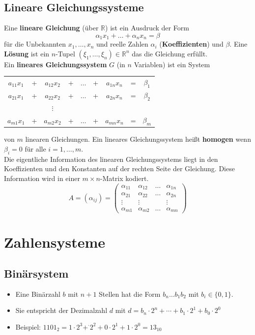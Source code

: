 \documentclass[12pt]{article}
\begin{document}
\subsection{Lineare Gleichungssysteme}
Eine \textbf{lineare Gleichung} (über $\mathbb{R}$) ist ein Ausdruck der Form
\[\alpha_1x_1 + \dots + \alpha_nx_n = \beta\]
für die Unbekannten $x_1, \dots, x_n$ und reelle Zahlen $\alpha_i$ (\textbf{Koeffizienten}) und $\beta$. Eine \textbf{Lösung} ist ein $n$-Tupel $(\xi_1, \dots, \xi_n) \in \mathbb{R}^n$ das die Gleichung erfüllt. \\
\newline
Ein \textbf{lineares Gleichungssystem} $G$ (in $n$ Variablen) ist ein System \\
\begin{center}
    \begin{tabular}{c c c c c c c c c}
        $a_{11}x_1$ & + & $a_{12}x_2$ & + & $\dots$ & + & $a_{1n}x_n$ & = & $\beta_1$ \\ 
        $a_{21}x_1$ & + & $a_{22}x_2$ & + & $\dots$ & + & $a_{2n}x_n$ & = & $\beta_2$ \\ 
        & & $\vdots$ & & & & \\
        $a_{m1}x_1$ & + & $a_{m2}x_2$ & + & $\dots$ & + & $a_{mn}x_n$ & = & $\beta_m$ \\ 
    \end{tabular}
\end{center}
von $m$ linearen Gleichungen. Ein lineares Gleichungssystem heißt \textbf{homogen} wenn $\beta_i = 0$ für alle $i=1,\dots,m$. \\
\newline
Die eigentliche Information des linearen Gleichungssystems liegt in den Koeffizienten und den Konstanten auf der rechten Seite der Gleichung. Diese Information wird in einer $m \times n$-Matrix kodiert.
\[A = (\alpha_{ij}) = \left(\begin{matrix}
    \alpha_{11} & \alpha_{12} & \dots & \alpha_{1n} \\
    \alpha_{21} & \alpha_{22} & \dots & \alpha_{2n} \\
    \vdots & \vdots & & \vdots \\
    \alpha_{m1} & \alpha_{m2} & \dots & \alpha_{mn}
\end{matrix}\right)\]

\section{Zahlensysteme}
\subsection{Binärsystem}
\begin{itemize}[leftmargin=*]
    \item[] Eine Binärzahl $b$ mit $n + 1$ Stellen hat die Form $b_n\dots b_1 b_2$ mit $b_i \in \{0,1\}$.
    \item[] Sie entspricht der Dezimalzahl $d$ mit $d = b_n \cdot 2^n + \cdots + b_1 \cdot 2^1 + b_0 \cdot 2^0$ 
    \item[] Beispiel: $1101_2 = 1 \cdot 2^3 + ^\cdot 2^2 + 0 \cdot 2^1 + 1 \cdot 2^0 = 13_{10}$
\end{itemize}
\end{document}
